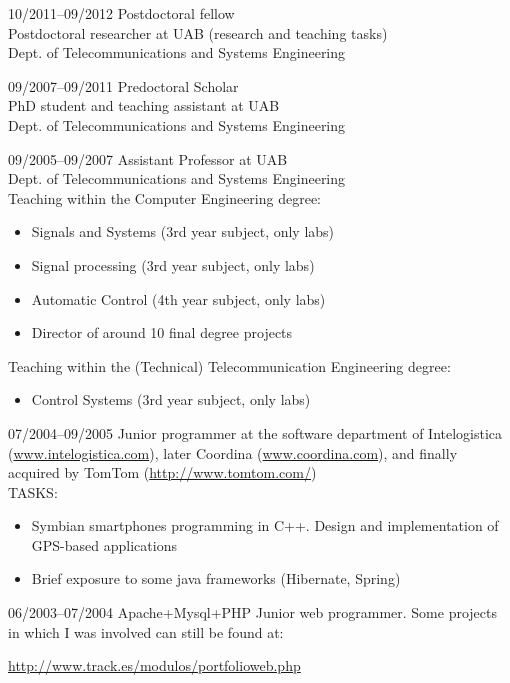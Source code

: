 \documentclass[a4paper]{article}
\begin{document}
\begin{CV}
\item[10/2011--09/2012] Postdoctoral fellow\\
Postdoctoral researcher at UAB (research and teaching tasks) \\
Dept. of Telecommunications and Systems Engineering
\item[09/2007--09/2011] Predoctoral Scholar\\
PhD student and teaching assistant at UAB\\
Dept. of Telecommunications and Systems Engineering
\item[09/2005--09/2007] Assistant Professor at UAB\\
Dept. of Telecommunications and Systems Engineering
\vspace{0.2cm}
\noindent \\Teaching within the Computer Engineering degree:
\begin{itemize}
\item Signals and Systems (3rd year subject, only labs)
\item Signal processing (3rd year subject, only labs)
\item Automatic Control (4th year subject, only labs)
\item Director of around 10 final degree projects
\end{itemize}
Teaching within the (Technical) Telecommunication Engineering degree:
\begin{itemize}
\item Control Systems (3rd year subject, only labs)
\end{itemize}

\item[07/2004--09/2005] Junior programmer at the software department
of Intelogistica (\url{www.intelogistica.com}), later Coordina (\url{www.coordina.com}), and finally acquired by TomTom (\url{http://www.tomtom.com/})
\vspace{0.4cm}\\TASKS:\vspace{0.15cm}
\begin{itemize}
\item Symbian smartphones programming in C++. Design and implementation of GPS-based applications
\item Brief exposure to some java frameworks (Hibernate, Spring)
\end{itemize}


\item[06/2003--07/2004] Apache+Mysql+PHP Junior web programmer. Some
projects in which I was involved can still be found at:\\
\vspace{-0.4cm}
\begin{center}\url{http://www.track.es/modulos/portfolioweb.php}\end{center}

\end{CV}
\end{document}
